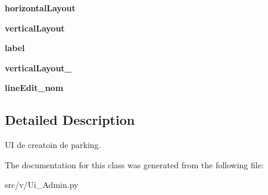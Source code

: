 \begin{DoxyCompactItemize}
\item 
\hypertarget{classsrc_1_1v_1_1_ui___admin_1_1_ui___crea_parking_aa7d468064bafb60ea0c306a87ea91a01}{}{\bfseries horizontal\+Layout}\label{classsrc_1_1v_1_1_ui___admin_1_1_ui___crea_parking_aa7d468064bafb60ea0c306a87ea91a01}

\item 
\hypertarget{classsrc_1_1v_1_1_ui___admin_1_1_ui___crea_parking_a2147a034c0774d591f8f0ce474788c4d}{}{\bfseries vertical\+Layout}\label{classsrc_1_1v_1_1_ui___admin_1_1_ui___crea_parking_a2147a034c0774d591f8f0ce474788c4d}

\item 
\hypertarget{classsrc_1_1v_1_1_ui___admin_1_1_ui___crea_parking_ab868c65f188726d983787968cc34422e}{}{\bfseries label}\label{classsrc_1_1v_1_1_ui___admin_1_1_ui___crea_parking_ab868c65f188726d983787968cc34422e}

\item 
\hypertarget{classsrc_1_1v_1_1_ui___admin_1_1_ui___crea_parking_a6427ff8c82defa90c7a24d1e9f0186fc}{}{\bfseries vertical\+Layout\+\_}\label{classsrc_1_1v_1_1_ui___admin_1_1_ui___crea_parking_a6427ff8c82defa90c7a24d1e9f0186fc}

\item 
\hypertarget{classsrc_1_1v_1_1_ui___admin_1_1_ui___crea_parking_a10accf27270033537230b72fdccc558d}{}{\bfseries line\+Edit\+\_\+nom}\label{classsrc_1_1v_1_1_ui___admin_1_1_ui___crea_parking_a10accf27270033537230b72fdccc558d}

\end{DoxyCompactItemize}


\subsection{Detailed Description}
U\+I de creatoin de parking. 

The documentation for this class was generated from the following file\+:\begin{DoxyCompactItemize}
\item 
src/v/Ui\+\_\+\+Admin.\+py\end{DoxyCompactItemize}
